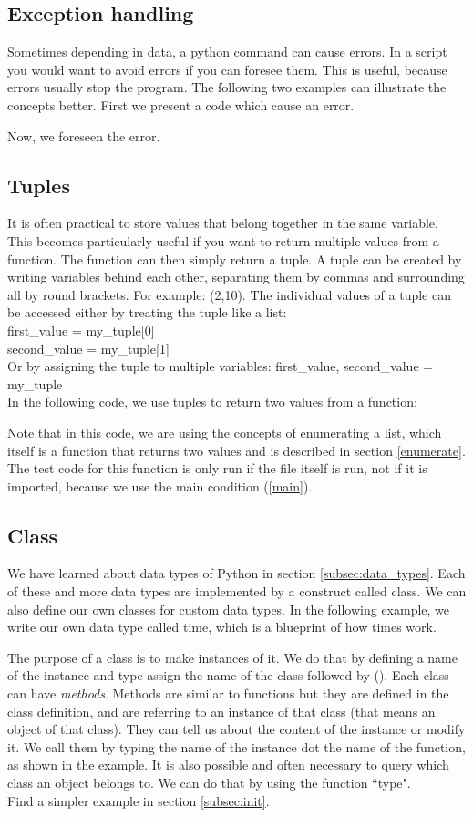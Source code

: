 \documentclass[10pt,a4paper]{article}
\begin{document}
\subsection{Exception handling}
Sometimes depending in data, a python command can cause errors. In a script you would want to avoid errors if you can foresee them. This is useful, because errors usually stop the program. The following two examples  can illustrate the concepts better. First we present a code which cause an error.

Now, we foreseen the error.

\subsection{Tuples}
It is often practical to store values that belong together in the same variable. This becomes particularly useful if you want to return multiple values from a function. The function can then simply return a tuple. A tuple can be created by writing variables behind each other, separating them by commas and surrounding all by round brackets. For example:
(2,10).
The individual values of a tuple can be accessed either by treating the tuple like a list:\\
first\_value = my\_tuple[0]\\
second\_value = my\_tuple[1]
\\
Or by assigning the tuple to multiple variables:
first\_value, second\_value = my\_tuple
\\
In the following code, we use tuples to return two values from a function:

Note that in this code, we are using the concepts of enumerating a list, which      itself is a function that returns two values and is described in section \ref{enumerate}. The test code for this function is only run if the file itself is run, not if it is imported, because we use the main condition (\ref{main}).
\subsection{Class}
\label{class}
We have learned about data types of Python in section \ref{subsec:data_types}. Each of these and more data types are implemented by a construct called class. We can also define our own classes for custom data types. In the following example, we write our own data type called time, which is a blueprint of how times work.

The purpose of a class is to make instances of it. We do that by defining a name of the instance and type assign the name of the class followed by (). Each class can have \textit{methods}. Methods are similar to functions but they are defined in the class definition, and are referring to an instance of that class (that means an object of that class). They can tell us about the content of the instance or modify it. We call them by typing the name of the instance dot the name of the function, as shown in the example.
It is also possible and often necessary to query which class an object belongs to. We can do that by using the function ``type".
\\
Find a simpler example in section \ref{subsec:init}.
\end{document}

